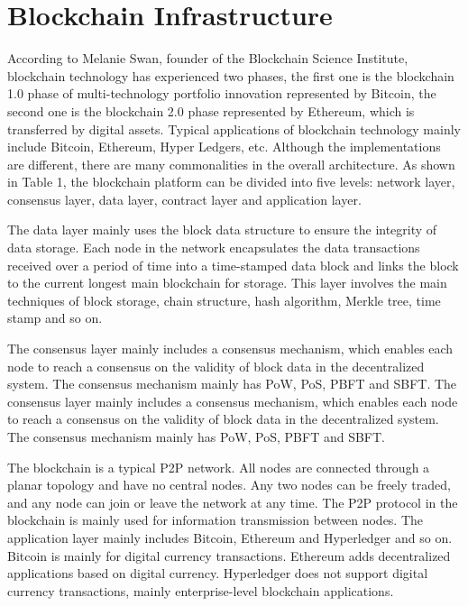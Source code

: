\documentclass[BTech]{srmuthesis}
\begin{document}
 \section{Blockchain Infrastructure}
 According to Melanie Swan, founder of the Blockchain Science Institute, blockchain technology has experienced two phases, the first one is the blockchain 1.0 phase of multi-technology portfolio innovation represented by Bitcoin, the second one is the blockchain 2.0 phase represented by Ethereum, which is transferred by digital assets. Typical applications of blockchain technology mainly include Bitcoin, Ethereum, Hyper Ledgers, etc. Although the implementations are different, there are many commonalities in the overall architecture. As shown in Table 1, the blockchain platform can be divided into five levels: network layer, consensus layer, data layer, contract layer and application layer.

 The data layer mainly uses the block data structure to ensure the integrity of data storage. Each node in the network encapsulates the data transactions received over a period of time into a time-stamped data block and links the block to the current longest main blockchain for storage. This layer involves the main techniques of block storage, chain structure, hash algorithm, Merkle tree, time stamp and so on.

 The consensus layer mainly includes a consensus mechanism, which enables each node to reach a consensus on the validity of block data in the decentralized system. The consensus mechanism mainly has PoW, PoS, PBFT and SBFT. The consensus layer mainly includes a consensus mechanism, which enables each node to reach a consensus on the validity of block data in the decentralized system. The consensus mechanism mainly has PoW, PoS, PBFT and SBFT.

 The blockchain is a typical P2P network. All nodes are connected through a planar topology and have no central nodes. Any two nodes can be freely traded, and any node can join or leave the network at any time. The P2P protocol in the blockchain is mainly used for information transmission between nodes. The application layer mainly includes Bitcoin, Ethereum and Hyperledger and so on. Bitcoin is mainly for digital currency transactions. Ethereum adds decentralized applications based on digital currency. Hyperledger does not support digital currency transactions, mainly enterprise-level blockchain applications.
\end{document}
